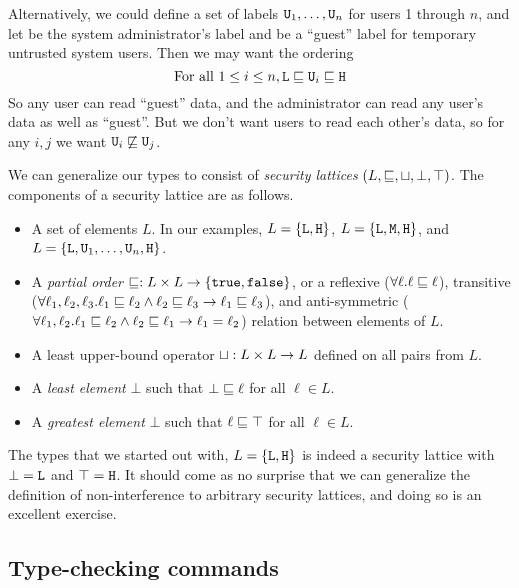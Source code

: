 \documentclass[11pt,twoside]{scrartcl}
\begin{document}
Alternatively, we could define a set of labels $\texttt{\upshape U}_1, \ldots, \texttt{\upshape U}_n$ for users 1 through $n$, and let \hisec be the system administrator's label and \lowsec be a ``guest'' label for temporary untrusted system users. Then we may want the ordering
\begin{equation}
\label{eq:ord3}
\text{For all}~1 \le i \le n, \lowsec \posetleq \usec_i \posetleq \hisec
\end{equation}
So any user can read ``guest'' data, and the administrator can read any user's data as well as ``guest''. But we don't want users to read each other's data, so for any $i,j$ we want $\texttt{\upshape U}_i \not\sqsubseteq \texttt{\upshape U}_j$.

We can generalize our types to consist of \emph{security lattices} $(L, \sqsubseteq, \sqcup, \bot, \top)$. The components of a security lattice are as follows.
\begin{itemize}
\item A set of elements $L$. In our examples, $L = \{\texttt{\upshape L},\texttt{\upshape H}\}$, $L = \{\texttt{\upshape L},\texttt{\upshape M},\texttt{\upshape H}\}$, and $L = \{\texttt{\upshape L},\texttt{\upshape U}_1,\ldots,\texttt{\upshape U}_n,\texttt{\upshape H}\}$.
\item A \emph{partial order} $\sqsubseteq : L \times L \to \{\texttt{\upshape true},\texttt{\upshape false}\}$, or a reflexive ($\forall \ell . \ell \sqsubseteq \ell$), transitive ($\forall \ell_1,\ell_2,\ell_3 . \ell_1 \sqsubseteq \ell_2 \land \ell_2 \sqsubseteq \ell_3 \rightarrow \ell_1 \sqsubseteq \ell_3$), and anti-symmetric ($\forall \ell_1,\ell_2 . \ell_1 \sqsubseteq \ell_2 \land \ell_2 \sqsubseteq \ell_1 \rightarrow \ell_1 = \ell_2$) relation between elements of $L$.
\item A least upper-bound operator $\sqcup : L \times L \to L$ defined on all pairs from $L$.
\item A \emph{least element} $\bot$ such that $\bot \sqsubseteq \ell$ for all $\ell \in L$.
\item A \emph{greatest element} $\bot$ such that $\ell \sqsubseteq \top$ for all $\ell \in L$.
\end{itemize}
The types that we started out with, $L = \{\texttt{\upshape L},\texttt{\upshape H}\}$ is indeed a security lattice with $\bot = \texttt{\upshape L}$ and $\top = \texttt{\upshape H}$. It should come as no surprise that we can generalize the definition of non-interference to arbitrary security lattices, and doing so is an excellent exercise.

\subsection{Type-checking commands}
\end{document}
